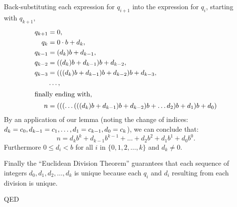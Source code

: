 \documentclass{article}
\begin{document}
\break
Back-substituting each expression for \(q_{i+1}\) into the expression for \(q_i\),
starting with \(q_{k+1}\),
\begin{alignat*}{1}
q_{k+1} &= 0,\\
q_k &= 0\cdot{}b + d_k,\\
q_{k-1} &= (d_k)b + d_{k-1},\\
q_{k-2} &= ((d_k)b + d_{k-1})b + d_{k-2},\\
q_{k-3} &= (((d_k)b + d_{k-1})b + d_{k-2})b + d_{k-3},\\
 &\dots{},\\
\intertext{finally ending with,}
n &= (((\dots{}(((d_k)b + d_{k-1})b + d_{k-2})b + \dots{} d_{2})b + d_{1})b + d_0)
\end{alignat*}
By an application of our lemma (noting the change of indices: \(d_k = c_0,
d_{k-1} = c_1, \dots{},\newline d_1 = c_{k-1}, d_0 = c_k\)), we can conclude that:
\[n = d_kb^k+d_{k-1}b^{k-1}+\dots+d_2b^2+d_1b^1+d_0b^0.\]
Furthermore \(0\le{}d_i<b\) for all \(i\) in \(\{0,1,2,\dots{},k\}\) and \(d_k\ne0\).

Finally the ``Euclidean Division Theorem'' guarantees that each sequence
of integers \(d_0, d_1, d_2, \dots{}, d_k\) is unique
because each \(q_i\) and \(d_i\) resulting from each division is unique.

QED
\end{document}
